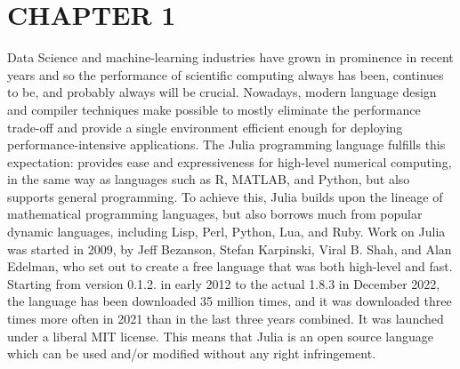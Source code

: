 \documentclass{article}
\begin{document}
\section{CHAPTER 1}
Data Science and machine-learning industries have grown in prominence in recent years and so the performance of scientific computing always has been, continues to be, and probably always will be crucial.
Nowadays, modern language design and compiler techniques make possible to mostly eliminate the performance trade-off and provide a single environment efficient enough for deploying performance-intensive applications. The Julia programming language fulfills this expectation: provides ease and expressiveness for high-level numerical computing, in the same way as languages such as R, MATLAB, and Python, but also supports general programming. To achieve this, Julia builds upon the lineage of mathematical programming languages, but also borrows much from popular dynamic languages, including Lisp, Perl, Python, Lua, and Ruby.
Work on Julia was started in 2009, by Jeff Bezanson, Stefan Karpinski, Viral B. Shah, and Alan Edelman, who set out to create a free language that was both high-level and fast. Starting from version 0.1.2. in early 2012 to the actual 1.8.3 in December 2022, the language has been downloaded 35 million times, and it was downloaded three times more often in 2021 than in the last three years combined.
It was launched under a liberal MIT license. This means that Julia is an open source language which can be used and/or modified without any right infringement.
\end{document}

